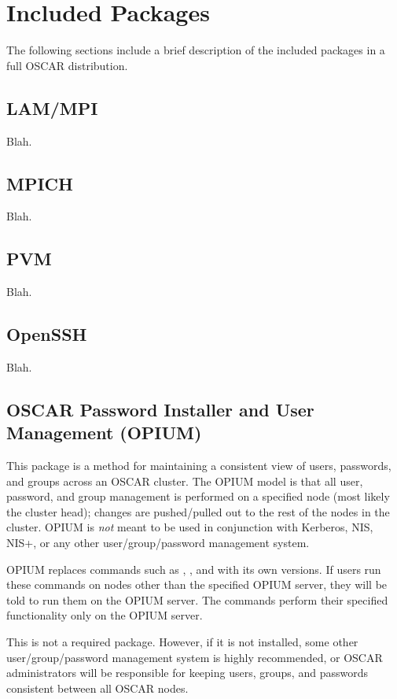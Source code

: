 %
%
%

\section{Included Packages}

The following sections include a brief description of the included
packages in a full OSCAR distribution.

\subsection{LAM/MPI}

Blah.

\subsection{MPICH}

Blah.

\subsection{PVM}

Blah.

\subsection{OpenSSH}

Blah.

\subsection{OSCAR Password Installer and User Management (OPIUM)}

This package is a method for maintaining a consistent view of users,
passwords, and groups across an OSCAR cluster.  The OPIUM model is
that all user, password, and group management is performed on a
specified node (most likely the cluster head); changes are
pushed/pulled out to the rest of the nodes in the cluster.  OPIUM is
{\em not} meant to be used in conjunction with Kerberos, NIS, NIS+, or
any other user/group/password management system.

OPIUM replaces commands such as , , and
 with its own versions.  If users run these commands on
nodes other than the specified OPIUM server, they will be told to run
them on the OPIUM server.  The commands perform their specified
functionality only on the OPIUM server.

This is not a required package.  However, if it is not installed, some
other user/group/password management system is highly recommended, or
OSCAR administrators will be responsible for keeping users, groups,
and passwords consistent between all OSCAR nodes.


